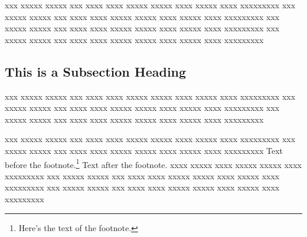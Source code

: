 xxx xxxxx xxxxx xxx xxxx xxxx xxxxx xxxxx xxxx xxxxx xxxx xxxxxxxxx
xxx xxxxx xxxxx xxx xxxx xxxx xxxxx xxxxx xxxx xxxxx xxxx xxxxxxxxx
xxx xxxxx xxxxx xxx xxxx xxxx xxxxx xxxxx xxxx xxxxx xxxx xxxxxxxxx
xxx xxxxx xxxxx xxx xxxx xxxx xxxxx xxxxx xxxx xxxxx xxxx xxxxxxxxx
 
\subsection{This is a Subsection Heading} 
 
xxx xxxxx xxxxx xxx xxxx xxxx xxxxx xxxxx xxxx xxxxx xxxx xxxxxxxxx
xxx xxxxx xxxxx xxx xxxx xxxx xxxxx xxxxx xxxx xxxxx xxxx xxxxxxxxx
xxx xxxxx xxxxx xxx xxxx xxxx xxxxx xxxxx xxxx xxxxx xxxx xxxxxxxxx
 
xxx xxxxx xxxxx xxx xxxx xxxx xxxxx xxxxx xxxx xxxxx xxxx xxxxxxxxx
xxx xxxxx xxxxx xxx xxxx xxxx xxxxx xxxxx xxxx xxxxx xxxx xxxxxxxxx
Text before the footnote.\footnote{Here's the text of the footnote.}
Text after the footnote. xxxx xxxxx xxxx xxxxx xxxxx xxxx xxxxxxxxx
xxx xxxxx xxxxx xxx xxxx xxxx xxxxx xxxxx xxxx xxxxx xxxx xxxxxxxxx
xxx xxxxx xxxxx xxx xxxx xxxx xxxxx xxxxx xxxx xxxxx xxxx xxxxxxxxx
